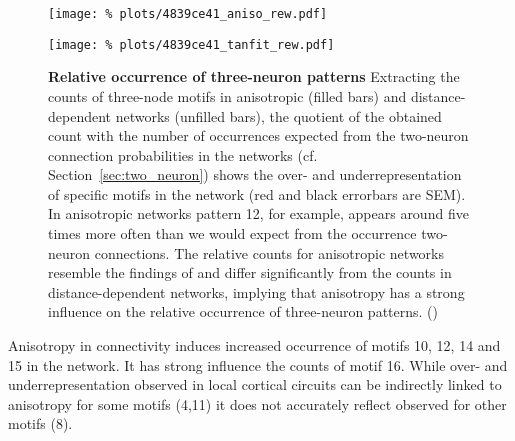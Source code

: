 

\begin{figure}[H]
  \centering
  \texttt{[image: \%
    plots/4839ce41\_aniso\_rew.pdf]}

  \texttt{[image: \%
    plots/4839ce41\_tanfit\_rew.pdf]}

  \vspace{0.4cm}


  \captionsetup{skip=8pt}
  \caption{\textbf{Relative occurrence of three-neuron patterns}
    Extracting the counts of three-node motifs in anisotropic (filled
    bars) and distance-dependent networks (unfilled bars), the
    quotient of the obtained count with the number of occurrences
    expected from the two-neuron connection probabilities in the
    networks (cf. Section~\ref{sec:two_neuron}) shows the over- and
    underrepresentation of specific motifs in the network (red and
    black errorbars are SEM). In anisotropic networks pattern 12, for
    example, appears around five times more often than we would expect
    from the occurrence two-neuron connections. The relative counts
    for anisotropic networks resemble the findings of
    \textcite{Song2005} and differ significantly from the counts in
    distance-dependent networks, implying that anisotropy has a strong
    influence on the relative occurrence of three-neuron
    patterns. () }
  \label{fig:3motif_full}
\end{figure}



Anisotropy in connectivity induces increased occurrence of motifs 10,
12, 14 and 15 in the network. It has strong influence the counts of
motif 16. While over- and underrepresentation observed in local
cortical circuits can be indirectly linked to anisotropy for some
motifs (4,11) it does not accurately reflect observed for other motifs
(8).



